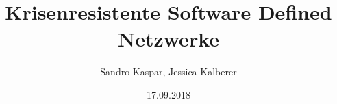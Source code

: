 \documentclass[12pt,titlepage]{article}
\title{Krisenresistente Software Defined Netzwerke}
\author{Sandro Kaspar, Jessica Kalberer}
\date{17.09.2018}
\begin{document}




\newpage
\renewcommand{\contentsname}{Inhaltsverzeichnis}
\tableofcontents
\newpage
{}


%
%
%


%
%
%
%
%
%


\newpage
\appendix
{}

%
%

%
%
%

%

\end{document}
